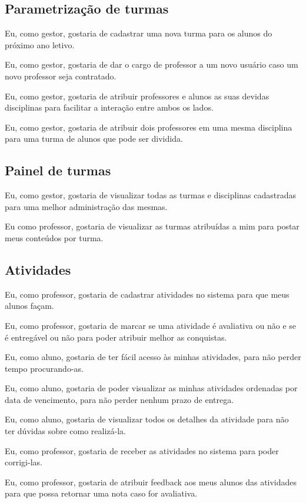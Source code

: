 \subsection{Parametrização de turmas}

Eu, como gestor, gostaria de cadastrar uma nova turma para os alunos do próximo ano letivo.

Eu, como gestor, gostaria de dar o cargo de professor a um novo usuário caso um novo professor seja contratado.

Eu, como gestor, gostaria de atribuir professores e alunos as suas devidas disciplinas para facilitar a interação entre ambos os lados.

Eu, como gestor, gostaria de atribuir dois professores em uma mesma disciplina para uma turma de alunos que pode ser dividida.

\subsection{Painel de turmas}
Eu, como gestor, gostaria de visualizar todas as turmas e disciplinas cadastradas para uma melhor administração das mesmas.

Eu como professor, gostaria de visualizar as turmas atribuídas a mim para postar meus conteúdos por turma.

\subsection{Atividades}
Eu, como professor, gostaria de cadastrar atividades no sistema para que meus alunos façam.

Eu, como professor, gostaria de marcar se uma atividade é avaliativa ou não e se é entregável ou não para poder atribuir melhor as conquistas.

Eu, como aluno, gostaria de ter fácil acesso às minhas atividades, para não perder tempo procurando-as.

Eu, como aluno, gostaria de poder visualizar as minhas atividades ordenadas por data de vencimento, para não perder nenhum prazo de entrega.

Eu, como aluno, gostaria de visualizar todos os detalhes da atividade para não ter dúvidas sobre como realizá-la.

Eu, como professor, gostaria de receber as atividades no sistema para poder corrigi-las.

Eu, como professor, gostaria de atribuir feedback aos meus alunos das atividades para que possa retornar uma nota caso for avaliativa.

